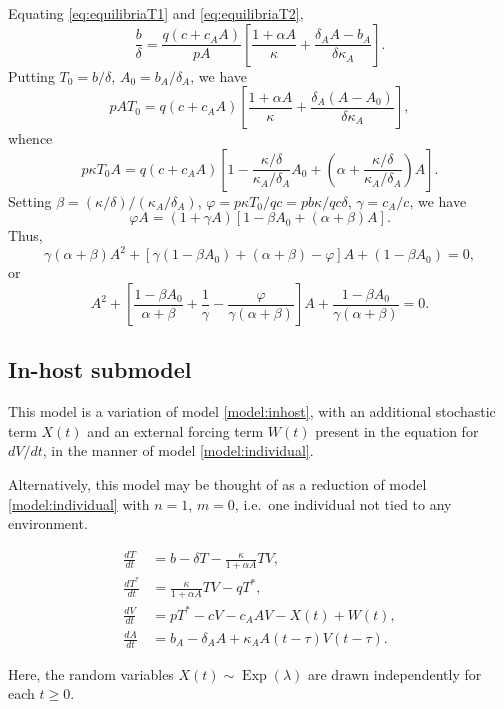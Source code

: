 \documentclass[11pt]{article}
\numberwithin{equation}{subsection}
\begin{document}
    Equating \ref{eq:equilibriaT1} and \ref{eq:equilibriaT2}, \[
        \frac{b}{\delta} = \frac{q(c + c_A A)}{pA}\left[\frac{1 + \alpha A}{\kappa} + \frac{\delta_A A - b_A}{\delta \kappa_A}\right].
    \] Putting $T_0 = b / \delta$, $A_0 = b_A / \delta_A$, we have \[
        pAT_0 = q(c + c_A A)\left[\frac{1 + \alpha A}{\kappa} + \frac{\delta_A(A - A_0)}{\delta \kappa_A}\right],
    \] whence \[
        p\kappa T_0 A
        = q(c + c_A A)\left[1 - \frac{\kappa/\delta}{\kappa_A/\delta_A}A_0 + \left(\alpha + \frac{\kappa / \delta}{\kappa_A / \delta_A}\right)A\right].
    \] Setting $\beta = (\kappa / \delta) / (\kappa_A / \delta_A)$, $\varphi =
    p \kappa T_0 / qc = pb\kappa / qc\delta$, $\gamma = c_A / c$, we have \[
        \varphi A = (1 + \gamma A)[1 - \beta A_0 + (\alpha + \beta)A].
    \] Thus, \[
        \gamma(\alpha + \beta)A^2 + [\gamma(1 - \beta A_0) + (\alpha + \beta) - \varphi] A + (1 - \beta A_0) = 0,
    \] or \[
        A^2 + \left[\frac{1 - \beta A_0}{\alpha + \beta} + \frac{1}{\gamma} - \frac{\varphi}{\gamma(\alpha + \beta)}\right] A + \frac{1 - \beta A_0}{\gamma(\alpha + \beta)} = 0.
    \]


    \subsection{In-host submodel} \label{model:inhost_stochastic}

    This model is a variation of model \ref{model:inhost}, with an additional
    stochastic term $X(t)$ and an external forcing term $W(t)$ present in the
    equation for $dV/dt$, in the manner of model \ref{model:individual}.

    Alternatively, this model may be thought of as a reduction of model
    \ref{model:individual} with $n = 1$, $m = 0$, i.e.\ one individual not
    tied to any environment.

    \begin{align}
        \frac{dT}{dt} &= b -  \delta T - \frac{\kappa}{1 + \alpha A} TV, \\
        \frac{dT^*}{dt} &= \frac{\kappa}{1 + \alpha A} TV - qT^*, \\
        \frac{dV}{dt} &= pT^* - cV - c_A AV - X(t) + W(t), \\
        \frac{dA}{dt} &= b_A -  \delta_A A + \kappa_A A(t - \tau)V(t - \tau).
    \end{align}

    Here, the random variables $X(t) \sim \operatorname{Exp}(\lambda)$ are
    drawn independently for each $t \geq 0$.
\end{document}
